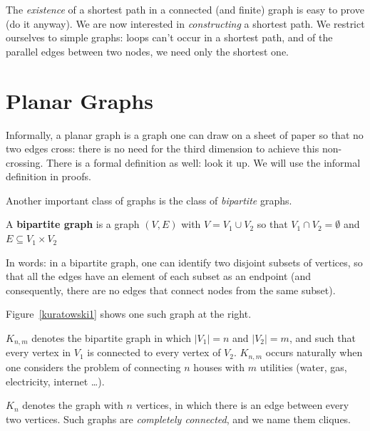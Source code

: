 The {\em existence} of a shortest path in a connected (and finite)
graph is easy to prove (do it anyway). We are now interested in {\em
constructing} a shortest path. We restrict ourselves to simple graphs:
loops can't occur in a shortest path, and of the parallel edges
between two nodes, we need only the shortest one.



\section{Planar Graphs}

Informally, a planar graph is a graph one can draw on a sheet of
paper so that no two edges cross: there is no need for the third
dimension to achieve this non-crossing. There is a formal definition
as well: look it up. We will use the informal definition in proofs.

Another important class of graphs is the class of {\em bipartite}
graphs.

 \begin{definition}
  \textup{A \textbf{bipartite graph} is a graph $(V,E)$ with $V =
V_{1} \cup V_{2}$ so that $V_{1} \cap V_{2} = \emptyset$ and $E
\subseteq V_{1} \times V_{2}$ }
\end{definition}

In words: in a bipartite graph, one can identify two disjoint subsets
of vertices, so that all the edges have an element of each subset as
an endpoint (and consequently, there are no edges that connect nodes
from the same subset).

Figure~\ref{kuratowski1} shows one such graph at the right.

$K_{n,m}$ denotes the bipartite graph in which $|V_{1}| = n$ and
$|V_{2}| = m$, and such that every vertex in $V_{1}$ is connected to
every vertex of $V_{2}$. $K_{n,m}$ occurs naturally when one considers
the problem of connecting $n$ houses with $m$ utilities (water, gas,
electricity, internet \ldots).

$K_{n}$ denotes the graph with $n$ vertices, in which there is an edge
between every two vertices. Such graphs are {\em completely
connected}, and we name them cliques.

